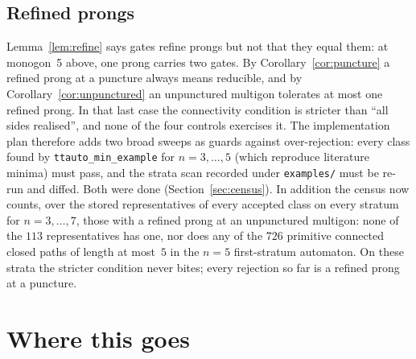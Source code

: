 \documentclass[12pt]{amsart}
\newcommand{\code}[1]{\texttt{#1}}
\theoremstyle{plain}
\theoremstyle{definition}
\begin{document}
\subsection*{Refined prongs}
Lemma~\ref{lem:refine} says gates refine prongs but not that they equal
them: at monogon~5 above, one prong carries two gates.  By
Corollary~\ref{cor:puncture} a refined prong at a puncture always means
reducible, and by Corollary~\ref{cor:unpunctured} an unpunctured multigon
tolerates at most one refined prong.  In that last case the connectivity
condition is stricter than ``all sides realised'', and none of the four
controls exercises it.
The implementation plan therefore adds two broad sweeps as guards against
over-rejection: every class found by \code{ttauto\_min\_example} for
$n=3,\dots,5$ (which reproduce literature minima) must pass, and the
strata scan recorded under \code{examples/} must be re-run and diffed.
Both were done (Section~\ref{sec:census}).  In addition the census now
counts, over the stored representatives of every accepted class on every
stratum for $n=3,\dots,7$, those with a refined prong at an unpunctured
multigon: none of the $113$ representatives has one, nor does any of the
$726$ primitive connected closed paths of length at most~$5$ in the
$n=5$ first-stratum automaton.  On these strata the stricter condition
never bites; every rejection so far is a refined prong at a puncture.

\section{Where this goes}
\label{sec:plan}
\end{document}
